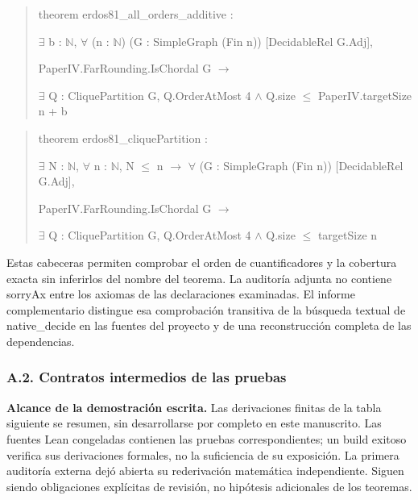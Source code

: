 \documentclass[spanish,11pt,a4paper]{article}
\begin{document}
\begin{quote}\footnotesize\ttfamily\raggedright
theorem erdos81\_all\_orders\_additive :\par
    \(\exists\) b : \(\mathbb N\), \(\forall\) (n : \(\mathbb N\)) (G : SimpleGraph (Fin n)) [DecidableRel G.Adj],\par
      PaperIV.FarRounding.IsChordal G \(\to\)\par
        \(\exists\) Q : CliquePartition G, Q.OrderAtMost 4 \(\land\) Q.size \(\le\) PaperIV.targetSize n + b\par
\end{quote}

\begin{quote}\footnotesize\ttfamily\raggedright
theorem erdos81\_cliquePartition :\par
    \(\exists\) N : \(\mathbb N\), \(\forall\) n : \(\mathbb N\), N \(\le\) n \(\to\) \(\forall\) (G : SimpleGraph (Fin n)) [DecidableRel G.Adj],\par
      PaperIV.FarRounding.IsChordal G \(\to\)\par
        \(\exists\) Q : CliquePartition G, Q.OrderAtMost 4 \(\land\) Q.size \(\le\) targetSize n\par
\end{quote}

Estas cabeceras permiten comprobar el orden de cuantificadores y la cobertura exacta sin inferirlos del nombre del teorema. La auditoría adjunta no contiene {\ttfamily\small sorryAx} entre los axiomas de las declaraciones examinadas. El informe complementario distingue esa comprobación transitiva de la búsqueda textual de {\ttfamily\small native\_\discretionary{\hbox{\ensuremath{\hookrightarrow}}}{}{}decide} en las fuentes del proyecto y de una reconstrucción completa de las dependencias.

\subsubsection{A.2. Contratos intermedios de las pruebas}\label{a.2.-contratos-intermedios-de-las-pruebas}

\textbf{Alcance de la demostración escrita.} Las derivaciones finitas de la tabla siguiente se resumen, sin desarrollarse por completo en este manuscrito. Las fuentes Lean congeladas contienen las pruebas correspondientes; un build exitoso verifica sus derivaciones formales, no la suficiencia de su exposición. La primera auditoría externa dejó abierta su rederivación matemática independiente. Siguen siendo obligaciones explícitas de revisión, no hipótesis adicionales de los teoremas.
\end{document}
